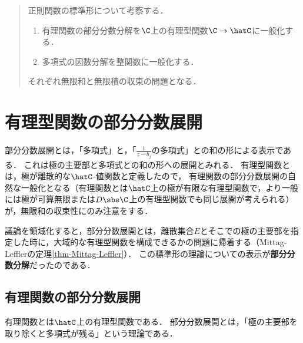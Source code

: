 \documentclass[uplatex, dvipdfmx]{jsreport}
\begin{document}
\begin{quotation}
    正則関数の標準形について考察する．
    \begin{enumerate}
        \item 有理関数の部分分数分解を$\C$上の有理型関数$\C\to\hatC$に一般化する．
        \item 多項式の因数分解を整関数に一般化する．
    \end{enumerate}
    それぞれ無限和と無限積の収束の問題となる．
\end{quotation}

\section{有理型関数の部分分数展開}

\begin{tcolorbox}[colframe=ForestGreen, colback=ForestGreen!10!white, breakable ,colbacktitle=ForestGreen!40!white, coltitle=black,fonttitle=\bfseries\sffamily,
    title=「極の主要部を取り除くと多項式が残る」理論]
    部分分数展開とは，「多項式」と，「$\frac{1}{z-b_j}$の多項式」との和の形による表示である．
    これは極の主要部と多項式との和の形への展開とみれる．
    有理型関数とは，極が離散的な$\hatC$-値関数と定義したので，
    有理関数の部分分数展開の自然な一般化となる（有理関数とは$\hatC$上の極が有限な有理型関数で，より一般には極が可算無限または$D\sbs\C$上の有理型関数でも同じ展開が考えられる）が，無限和の収束性にのみ注意をする．

    議論を領域化すると，部分分数展開とは，離散集合$E$とそこでの極の主要部を指定した時に，大域的な有理型関数を構成できるかの問題に帰着する（Mittag-Lefflerの定理\ref{thm-Mittag-Leffler}）．
    この標準形の理論についての表示が\textbf{部分分数分解}だったのである．
\end{tcolorbox}

\subsection{有理関数の部分分数展開}

\begin{tcolorbox}[colframe=ForestGreen, colback=ForestGreen!10!white,breakable,colbacktitle=ForestGreen!40!white,coltitle=black,fonttitle=\bfseries\sffamily,
title=]
    有理関数とは$\hatC$上の有理型関数である．
    部分分数展開とは，「極の主要部を取り除くと多項式が残る」という理論である．
\end{tcolorbox}
\end{document}
